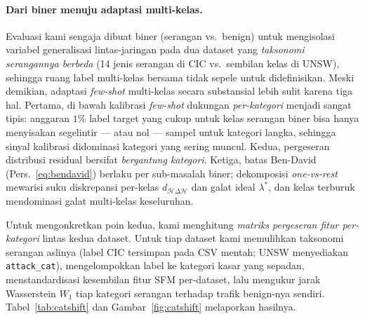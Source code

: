 \documentclass[11pt,a4paper]{article}
\begin{document}
\paragraph{Dari biner menuju adaptasi multi-kelas.} Evaluasi kami sengaja dibuat
biner (serangan vs.\ benign) untuk mengisolasi variabel generalisasi lintas-jaringan
pada dua dataset yang \emph{taksonomi serangannya berbeda} (14 jenis serangan di
CIC vs.\ sembilan kelas di UNSW), sehingga ruang label multi-kelas bersama tidak
sepele untuk didefinisikan. Meski demikian, adaptasi \emph{few-shot} multi-kelas
secara substansial lebih sulit karena tiga hal. Pertama, di bawah kalibrasi
\emph{few-shot} dukungan \emph{per-kategori} menjadi sangat tipis: anggaran $1\%$
label target yang cukup untuk kelas serangan biner bisa hanya menyisakan segelintir
--- atau nol --- sampel untuk kategori langka, sehingga sinyal kalibrasi didominasi
kategori yang sering muncul. Kedua, pergeseran distribusi residual bersifat
\emph{bergantung kategori}. Ketiga, batas Ben-David (Pers.~\eqref{eq:bendavid})
berlaku per sub-masalah biner; dekomposisi \emph{one-vs-rest} mewarisi suku
diskrepansi per-kelas $d_{\mathcal{H}\Delta\mathcal{H}}$ dan galat ideal
$\lambda^\ast$, dan kelas terburuk mendominasi galat multi-kelas keseluruhan.

Untuk mengonkretkan poin kedua, kami menghitung \emph{matriks pergeseran fitur
per-kategori} lintas kedua dataset. Untuk tiap dataset kami memulihkan taksonomi
serangan aslinya (label CIC tersimpan pada CSV mentah; UNSW menyediakan
\texttt{attack\_cat}), mengelompokkan label ke kategori kasar yang sepadan,
menstandardisasi kesembilan fitur SFM per-dataset, lalu mengukur jarak Wasserstein
$W_1$ tiap kategori serangan terhadap trafik benign-nya sendiri. Tabel~\ref{tab:catshift}
dan Gambar~\ref{fig:catshift} melaporkan hasilnya.
\end{document}
